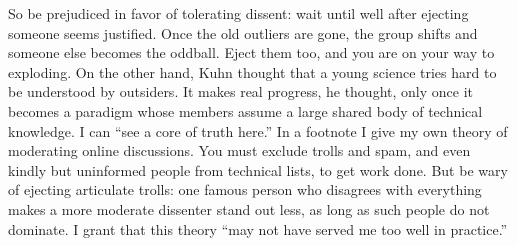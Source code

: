 So be prejudiced in favor of tolerating dissent: wait until well after ejecting someone seems justified. Once the old outliers are gone, the group shifts and someone else becomes the oddball. Eject them too, and you are on your way to exploding. On the other hand, Kuhn thought that a young science tries hard to be understood by outsiders. It makes real progress, he thought, only once it becomes a paradigm whose members assume a large shared body of technical knowledge. I can ``see a core of truth here.''  In a footnote I give my own theory of moderating online discussions. You must exclude trolls and spam, and even kindly but uninformed people from technical lists, to get work done. But be wary of ejecting articulate trolls: one famous person who disagrees with everything makes a more moderate dissenter stand out less, as long as such people do not dominate. I grant that this theory ``may not have served me too well in practice.''
